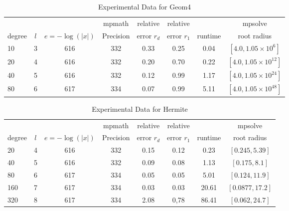 \documentclass[sigconf]{acmart}
\begin{document}
\begin{table}[t]
\caption{Experimental Data for Geom4}
\label{tab:geom4}
\vskip -0.15in
\begin{center}
\begin{small}
\begin{sc}
\begin{tabular}{lccccccc}
\toprule
&  &  & mpmath & relative  & relative &  & mpsolve \\
degree  & $l$& $e=-\log(|x|)$& Precision &error $r_d$       & error $r_1$ &runtime& root radius\\
\midrule
   10 & 3 & 616 & 332 & 0.33 & 0.25 & 0.04 & $[4.0, 1.05 \times 10^6]$ \\
   20 & 4 & 616 & 332 & 0.20 & 0.70 & 0.22 & $[4.0, 1.05 \times 10^12]$ \\
   40 & 5 & 616 & 332 & 0.12 & 0.99 & 1.17 & $[4.0, 1.05 \times 10^24]$ \\
   80 & 6 & 617 & 334 & 0.07 & 0.99 & 5.11 & $[4.0, 1.05 \times 10^48]$ \\
\bottomrule
\end{tabular}
\end{sc}
\end{small}
\end{center}
\vskip 0.05in
\end{table}

\begin{table}[t]
\caption{Experimental Data for Hermite}
\label{tab:hermite}
\vskip -0.15in
\begin{center}
\begin{small}
\begin{sc}
\begin{tabular}{lccccccc}
\toprule
&  &  & mpmath & relative  & relative &  & mpsolve \\
degree  & $l$& $e=-\log(|x|)$& Precision &error $r_d$       & error $r_1$ &runtime& root radius\\
\midrule
   20 & 4 & 616 & 332 & 0.15 & 0.12 & 0.23 & $[0.245,5.39]$ \\
   40 & 5 & 616 & 332 & 0.09 & 0.08 & 1.13 & $[0.175,8.1]$\\
   80 & 6 & 617 & 334 & 0.05 & 0.05 & 5.01 & $[0.124,11.9]$\\
 160 & 7 & 617 & 334 & 0.03 & 0.03 & 20.61 & $[0.0877,17.2]$\\
 320 & 8 & 617 & 334 & 2.08 & 0,78 & 86.41 & $[0.062,24.7]$\\
\bottomrule
\end{tabular}
\end{sc}
\end{small}
\end{center}
\vskip 0.05in
\end{table}
\end{document}
